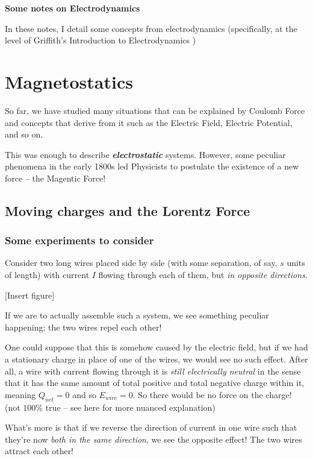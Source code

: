 \documentclass[12pt]{report}
\begin{document}
\begin{center}
    \textbf{Some notes on Electrodynamics}
\end{center}
In these notes, I detail some concepts from electrodynamics (specifically, at the level of Griffith's Introduction to Electrodynamics \cite{Griffiths})
\tableofcontents

\chapter{Magnetostatics}

So far, we have studied many situations that can be explained by Coulomb Force and concepts that derive from it such as the Electric Field, Electric Potential, and so on. 

This was enough to describe \textbf{\emph{electrostatic}} systems. However, some peculiar phenomena in the early 1800s led Physicists to postulate the existence of a new force -- the Magentic Force!

\section{Moving charges and the Lorentz Force}

\subsection{Some experiments to consider}

Consider two long wires placed side by side (with some separation, of say, $s$ units of length) with current $I$ flowing through each of them, but \emph{in opposite directions.}

[Insert figure]

If we are to actually assemble such a system, we see something peculiar happening; the two wires repel each other!

One could suppose that this is somehow caused by the electric field, but if we had a stationary charge in place of one of the wires, we would see no such effect. After all, a wire with current flowing through it is \emph{still electrically neutral} in the sense that it has the same amount of total positive and total negative charge within it, meaning $Q_{net} = 0$ and so $E_{wire} = 0$. So there would be no force on the charge! (not $100\%$ true -- see here for more nuanced explanation) 

What's more is that if we reverse the direction of current in one wire such that they're now \emph{both in the same direction}, we see the opposite effect! The two wires attract each other!
\end{document}
